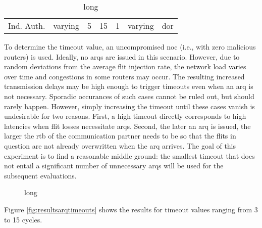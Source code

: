 \begin{table}
    \centering
    \begin{tabulary}{\textwidth}{C|C|C|C|C|C|C}
        \pProtVar{} & \pNCMode{} & \pEncMods{} & \pAuthMods{} & \pARQLimit{} & \pARQTimeout{} & \pRStrat{} \\\hline
        Ind. Auth. & varying & 5 & 15 & 1 & varying & \gls{dor} \\
    \end{tabulary}
    \caption[Input parameters for ARQ timeouts experiment]{long}
    \label{tab:setuparqtimeouts}
\end{table}

To determine the timeout value, an uncompromised \gls{noc} (i.e., with zero malicious routers) is used. Ideally, no \glspl{arq} are issued in this
scenario. However, due to random deviations from the average flit injection rate, the network load varies over time and congestions in some routers
may occur. The resulting increased transmission delays may be high enough to trigger timeouts even when an \gls{arq} is not necessary. Sporadic
occurances of such cases cannot be ruled out, but should rarely happen. However, simply increasing the timeout until these cases vanish is undesirable
for two reasons. First, a high timeout directly corresponds to high latencies when flit losses necessitate \glspl{arq}. Second, the later an \gls{arq}
is issued, the larger the \gls{rtb} of the communication partner needs to be so that the flits in question are not already overwritten when the
\gls{arq} arrives. The goal of this experiment is to find a reasonable middle ground: the smallest timeout that does not entail a significant number of
unnecessary \glspl{arq} will be used for the subsequent evaluations.

\begin{figure}
    \centering
    
    \caption[short]{long}
    \label{fig:resultsarqtimeouts}
\end{figure}

Figure \vref{fig:resultsarqtimeouts} shows the results for timeout values ranging from 3 to 15 cycles.


